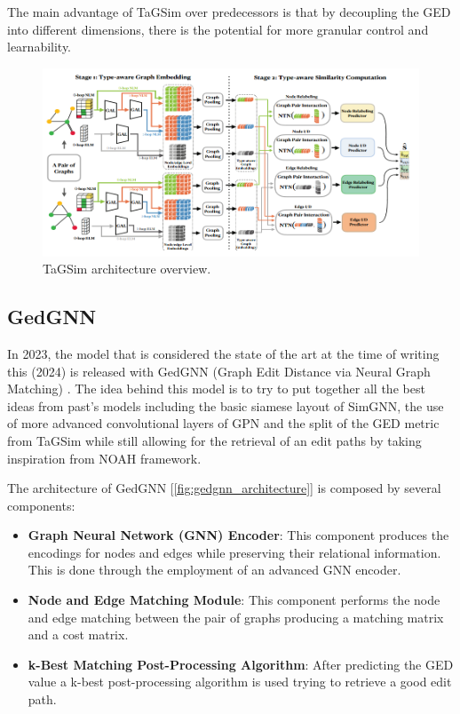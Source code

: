 \documentclass[../Thesis.tex]{subfiles}
\begin{document}
	The main advantage of TaGSim over predecessors is that by decoupling the GED into different dimensions, there is the potential for more granular control and learnability.
	
	\begin{figure}[H]
		\centering
		\includegraphics[width=\textwidth]{Images/tagsim_architecture.png}
		\caption{TaGSim architecture overview.}
		\label{fig:tagsim_architecture}
	\end{figure}

	\subsection{GedGNN}
	\label{sec:gedgnn}
	
	In 2023, the model that is considered the state of the art at the time of writing this (2024) is released with GedGNN (Graph Edit Distance via Neural Graph Matching) \cite{computing_graph_edit_distance_via_neural_graph_matching}. The idea behind this model is to try to put together all the best ideas from past's models including the basic siamese layout of SimGNN, the use of more advanced convolutional layers of GPN and the split of the GED metric from TaGSim while still allowing for the retrieval of an edit paths by taking inspiration from NOAH framework.
	
	The architecture of GedGNN [\autoref{fig:gedgnn_architecture}] is composed by several components:
	
	\begin{itemize}
		\item \textbf{Graph Neural Network (GNN) Encoder}: This component produces the encodings for nodes and edges while preserving their relational information. This is done through the employment of an advanced GNN encoder.
		\item \textbf{Node and Edge Matching Module}: This component performs the node and edge matching between the pair of graphs producing a matching matrix and a cost matrix.
		\item \textbf{k-Best Matching Post-Processing Algorithm}: After predicting the GED value a k-best post-processing algorithm is used trying to retrieve a good edit path.
	\end{itemize}
	
\end{document}
